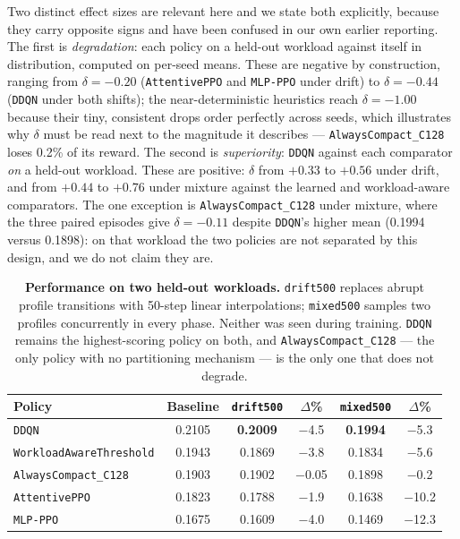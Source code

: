 \documentclass[fleqn,10pt]{wlscirep}
\newcommand{\attentive}{\texttt{AttentivePPO}}
\newcommand{\mlpppo}{\texttt{MLP-PPO}}
\newcommand{\ddqn}{\texttt{DDQN}}
\begin{document}
Two distinct effect sizes are relevant here and we state both
explicitly, because they carry opposite signs and have been confused in
our own earlier reporting. The first is \emph{degradation}: each policy
on a held-out workload against itself in distribution, computed on
per-seed means. These are negative by construction, ranging from
$\delta = -0.20$ (\attentive{} and \mlpppo{} under drift) to
$\delta = -0.44$ (\ddqn{} under both shifts); the near-deterministic
heuristics reach $\delta = -1.00$ because their tiny, consistent drops
order perfectly across seeds, which illustrates why $\delta$ must be
read next to the magnitude it describes --- \texttt{AlwaysCompact\_C128}
loses 0.2\% of its reward. The second is \emph{superiority}: \ddqn{}
against each comparator \emph{on} a held-out workload. These are
positive: $\delta$ from $+0.33$ to $+0.56$ under drift, and from
$+0.44$ to $+0.76$ under mixture against the learned and workload-aware
comparators. The one exception is \texttt{AlwaysCompact\_C128} under
mixture, where the three paired episodes give $\delta = -0.11$ despite
\ddqn{}'s higher mean (0.1994 versus 0.1898): on that workload the two
policies are not separated by this design, and we do not claim they
are.

\begin{table}[!htbp]
\centering
\begin{tabular}{lccccc}
\toprule
\textbf{Policy} & \textbf{Baseline} & \texttt{drift500} & $\Delta$\% &
  \texttt{mixed500} & $\Delta$\% \\
\midrule
\ddqn{}                          & 0.2105 & \textbf{0.2009} & $-$4.5  & \textbf{0.1994} & $-$5.3 \\
\texttt{WorkloadAwareThreshold}  & 0.1943 & 0.1869 & $-$3.8  & 0.1834 & $-$5.6 \\
\texttt{AlwaysCompact\_C128}     & 0.1903 & 0.1902 & $-$0.05 & 0.1898 & $-$0.2 \\
\attentive{}                     & 0.1823 & 0.1788 & $-$1.9  & 0.1638 & $-$10.2 \\
\mlpppo{}                        & 0.1675 & 0.1609 & $-$4.0  & 0.1469 & $-$12.3 \\
\bottomrule
\end{tabular}
\caption{\label{tab:generalization}\textbf{Performance on two held-out workloads.}
  \texttt{drift500} replaces abrupt profile transitions with 50-step
  linear interpolations; \texttt{mixed500} samples two profiles
  concurrently in every phase. Neither was seen during training.
  \ddqn{} remains the highest-scoring policy on both, and
  \texttt{AlwaysCompact\_C128} --- the only policy with no partitioning
  mechanism --- is the only one that does not degrade.}
\end{table}
\end{document}
